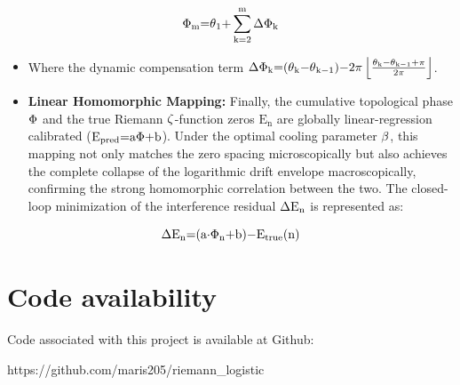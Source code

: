\documentclass[fleqn,10pt]{wlscirep}
\begin{document}
\[\text{\ensuremath{\Phi}}_{\text{m}}\text{=}\text{\ensuremath{\theta}}_{\text{1}}\text{+}\sum_{\text{k}\text{=2}}^{\text{m}}\text{\ensuremath{\Delta}}\text{\ensuremath{\Phi}}_{\text{k}}\]

\begin{itemize}
\item
  Where the dynamic compensation term
  \(\text{\ensuremath{\Delta}}\text{\ensuremath{\Phi}}_{\text{k}}\text{=(}\text{\ensuremath{\theta}}_{\text{k}}\text{\ensuremath{-}}\text{\ensuremath{\theta}}_{\text{k}\text{\ensuremath{-}1}}\text{)\ensuremath{-}2}\text{\ensuremath{\pi}}\left\lfloor \frac{\text{\ensuremath{\theta}}_{\text{k}}\text{\ensuremath{-}}\text{\ensuremath{\theta}}_{\text{k}\text{\ensuremath{-}1}}\text{+}\text{\ensuremath{\pi}}}{\text{2}\text{\ensuremath{\pi}}} \right\rfloor\).
\end{itemize}

\begin{itemize}
\item
  \textbf{Linear Homomorphic Mapping:} Finally, the cumulative
  topological phase \(\text{\ensuremath{\Phi}}\) and the true Riemann
  \(\text{\ensuremath{\zeta}}\)-function zeros \(\text{E}_{\text{n}}\) are globally
  linear-regression calibrated
  (\(\text{E}_{\text{pred}}\text{=}\text{a}\text{\ensuremath{\Phi}+}\text{b}\)). Under
  the optimal cooling parameter \(\text{\ensuremath{\beta}}\), this mapping not only
  matches the zero spacing microscopically but also achieves the
  complete collapse of the logarithmic drift envelope macroscopically,
  confirming the strong homomorphic correlation between the two. The
  closed-loop minimization of the interference residual
  \(\text{\ensuremath{\Delta}}\text{E}_{\text{n}}\) is represented as:
\end{itemize}

\[\text{\ensuremath{\Delta}}\text{E}_{\text{n}}\text{=(}\text{a}\text{\ensuremath{\cdot}}\text{\ensuremath{\Phi}}_{\text{n}}\text{+}\text{b}\text{)\ensuremath{-}}\text{E}_{\text{true}}\text{(}\text{n}\text{)}\]



\section*{Code availability}

Code associated with this project is available at Github:

{https://github.com/maris205/riemann\_logistic}
\end{document}
